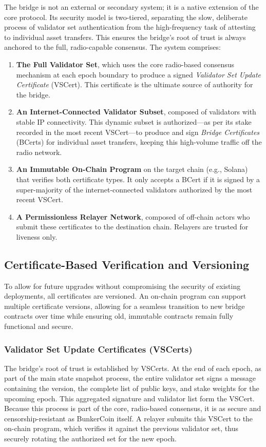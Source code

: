 \documentclass{article}
\begin{document}
The bridge is not an external or secondary system; it is a native extension of the core protocol. Its security model is two-tiered, separating the slow, deliberate process of validator set authentication from the high-frequency task of attesting to individual asset transfers. This ensures the bridge's root of trust is always anchored to the full, radio-capable consensus. The system comprises:

\begin{enumerate}
    \item \textbf{The Full Validator Set}, which uses the core radio-based consensus mechanism at each epoch boundary to produce a signed \emph{Validator Set Update Certificate} (VSCert). This certificate is the ultimate source of authority for the bridge.
    \item \textbf{An Internet-Connected Validator Subset}, composed of validators with stable IP connectivity. This dynamic subset is authorized---as per its stake recorded in the most recent VSCert---to produce and sign \emph{Bridge Certificates} (BCerts) for individual asset transfers, keeping this high-volume traffic off the radio network.
    \item \textbf{An Immutable On-Chain Program} on the target chain (e.g., Solana) that verifies both certificate types. It only accepts a BCert if it is signed by a super-majority of the internet-connected validators authorized by the most recent VSCert.
    \item \textbf{A Permissionless Relayer Network}, composed of off-chain actors who submit these certificates to the destination chain. Relayers are trusted for liveness only.
\end{enumerate}

\subsection{Certificate-Based Verification and Versioning}
To allow for future upgrades without compromising the security of existing deployments, all certificates are versioned. An on-chain program can support multiple certificate versions, allowing for a seamless transition to new bridge contracts over time while ensuring old, immutable contracts remain fully functional and secure.

\subsubsection{Validator Set Update Certificates (VSCerts)}
The bridge's root of trust is established by VSCerts. At the end of each epoch, as part of the main state snapshot process, the entire validator set signs a message containing the version, the complete list of public keys, and stake weights for the upcoming epoch. This aggregated signature and validator list form the VSCert. Because this process is part of the core, radio-based consensus, it is as secure and censorship-resistant as BunkerCoin itself. A relayer submits this VSCert to the on-chain program, which verifies it against the previous validator set, thus securely rotating the authorized set for the new epoch.
\end{document}
